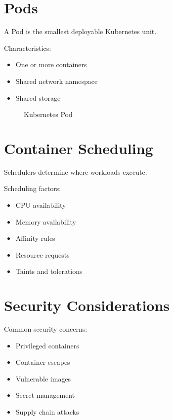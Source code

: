 \section{Pods}

A Pod is the smallest deployable Kubernetes unit.

Characteristics:

\begin{itemize}
\item One or more containers
\item Shared network namespace
\item Shared storage
\end{itemize}

\begin{figure}[H]
\centering
{}
\caption{Kubernetes Pod}
\end{figure}

\section{Container Scheduling}

Schedulers determine where workloads execute.

Scheduling factors:

\begin{itemize}
\item CPU availability
\item Memory availability
\item Affinity rules
\item Resource requests
\item Taints and tolerations
\end{itemize}

\section{Security Considerations}

Common security concerns:

\begin{itemize}
\item Privileged containers
\item Container escapes
\item Vulnerable images
\item Secret management
\item Supply chain attacks
\end{itemize}

